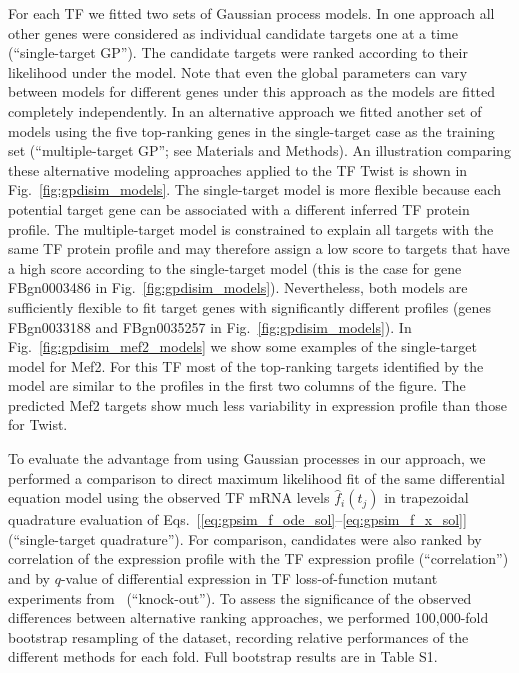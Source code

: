 \documentclass{pnastwo}
\begin{document}
\begin{article}
For each TF we fitted two sets of Gaussian process models. In one
approach all other genes were considered as individual candidate targets one at a
time (``single-target GP'').  The candidate targets were ranked
according to their likelihood under the model.  Note that even the global
parameters can vary between models for different genes under this approach as the models
are fitted completely independently. In an alternative approach we fitted another set of models using the five
top-ranking genes in the single-target case as the training set (``multiple-target GP''; see
Materials and Methods).  An illustration comparing these alternative
modeling approaches applied to the TF Twist is shown in Fig.~\ref{fig:gpdisim_models}. The
single-target model is more flexible because each
potential target gene can be associated with a different inferred TF
protein profile. The multiple-target model is constrained to explain
all targets with the same TF protein profile and may therefore assign
a low score to targets that have a high score according to the
single-target model (this is the case for gene FBgn0003486 in
Fig.~\ref{fig:gpdisim_models}). Nevertheless, both models are
sufficiently flexible to fit target genes with significantly different
profiles (genes FBgn0033188 and FBgn0035257 in
Fig.~\ref{fig:gpdisim_models}).
In Fig.~\ref{fig:gpdisim_mef2_models} we show some examples of the
single-target model for Mef2.  For this TF most of the
top-ranking targets identified by the model are similar to the
profiles in the first two columns of the figure.
The predicted Mef2 targets show much less variability in expression
profile than those for Twist.

To evaluate the advantage from using Gaussian processes in our
approach, we performed a comparison to direct maximum likelihood fit
of the same differential equation model using the observed TF mRNA
levels $\hat{f}_i(t_j)$ in trapezoidal quadrature evaluation of
Eqs.~[\ref{eq:gpsim_f_ode_sol}--\ref{eq:gpsim_f_x_sol}]
(``single-target quadrature'').
For comparison, candidates were also ranked by correlation of the
expression profile with the TF expression profile (``correlation'')
and by $q$-value of differential expression in TF loss-of-function mutant
experiments from~\cite{Sandmann2006a,Sandmann2007} (``knock-out''). 
To assess the significance of the observed differences between
alternative ranking approaches, we performed 100,000-fold bootstrap
resampling of the dataset, 
recording relative performances of the different methods for each
fold. Full bootstrap results are in Table S1.



\end{article}
\end{document}
